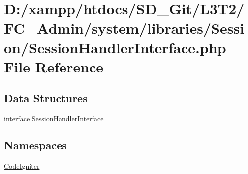 \hypertarget{_session_handler_interface_8php}{}\section{D\+:/xampp/htdocs/\+S\+D\+\_\+\+Git/\+L3\+T2/\+F\+C\+\_\+\+Admin/system/libraries/\+Session/\+Session\+Handler\+Interface.php File Reference}
\label{_session_handler_interface_8php}
\subsection*{Data Structures}
\begin{DoxyCompactItemize}
\item 
interface \hyperlink{interface_session_handler_interface}{Session\+Handler\+Interface}
\end{DoxyCompactItemize}
\subsection*{Namespaces}
\begin{DoxyCompactItemize}
\item 
 \hyperlink{namespace_code_igniter}{Code\+Igniter}
\end{DoxyCompactItemize}
